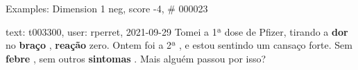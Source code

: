 \begin{frame}{Examples: Dimension 1 neg, score -4, \# 000023}
\footnotesize
\begin{alertblock}{text: t003300, user: rperret, 2021-09-29}
Tomei a 1ª dose de Pfizer, tirando a \textbf{dor} no \textbf{braço} , 
\textbf{reação} zero. Ontem foi a 2ª , e estou sentindo um cansaço forte. Sem 
\textbf{febre} , sem outros \textbf{sintomas} . Mais alguém passou por isso? 
\end{alertblock}
\end{frame}

